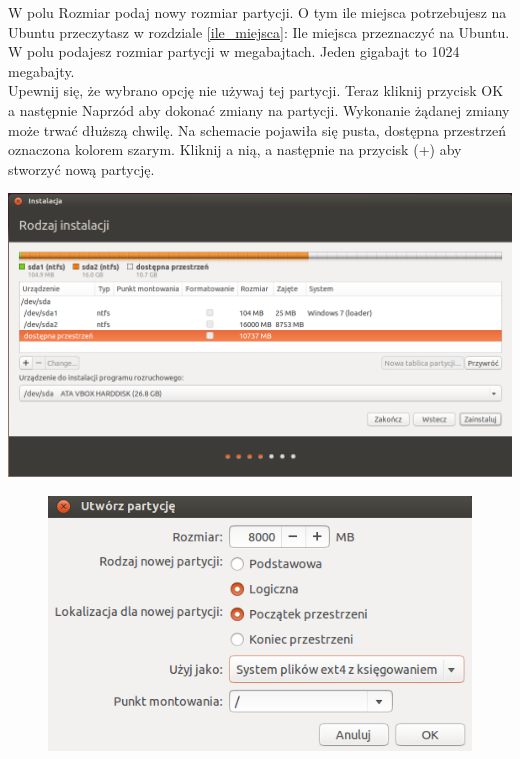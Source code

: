 W polu \textcolor{ubuntu_orange}{Rozmiar} podaj nowy rozmiar partycji. O tym ile miejsca potrzebujesz na Ubuntu przeczytasz w rozdziale \ref{ile_miejsca}: Ile miejsca przeznaczyć na Ubuntu. W polu podajesz rozmiar partycji w megabajtach. Jeden gigabajt to 1024 megabajty.\\
Upewnij się, że wybrano opcję \textcolor{ubuntu_orange}{nie używaj tej partycji}. Teraz kliknij przycisk \textcolor{ubuntu_orange}{OK} a następnie \textcolor{ubuntu_orange}{Naprzód} aby dokonać zmiany na partycji. Wykonanie żądanej zmiany może trwać dłuższą chwilę.
Na schemacie pojawiła się pusta, \textcolor{ubuntu_orange}{dostępna przestrzeń} oznaczona kolorem szarym. Kliknij a nią, a następnie na przycisk (\textcolor{ubuntu_orange}{+}) aby stworzyć nową partycję.

\begin{center}
        \includegraphics[width=\linewidth]{images/instalator_partycjonowanie_gparted3.png}
\end{center}

\clearpage
\begin{figure}
                \includegraphics[width=\linewidth]{images/instalator_partycjonowanie_gparted_dodaj_root.png}
\end{figure}

